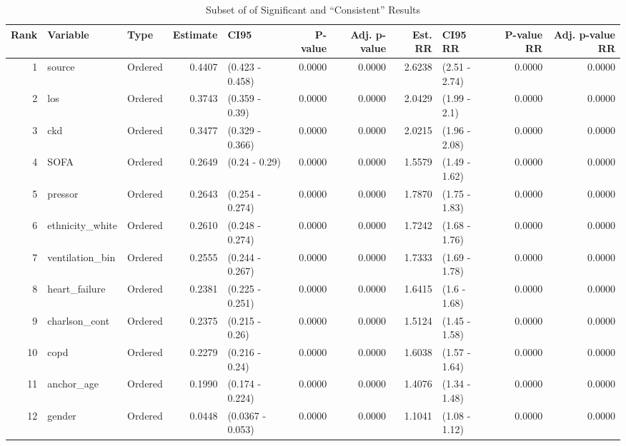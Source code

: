 \begin{table}[ht]
\centering
\caption{Subset of of Significant and ``Consistent'' Results} 
\label{consisRes}
\begin{tabular}{rllrlrrrlrr}
  \hline
Rank & Variable & Type & Estimate & CI95 & P-value & Adj. p-value & Est. RR & CI95 RR & P-value RR & Adj. p-value RR \\ 
  \hline
    1 & source & Ordered & 0.4407 & (0.423 - 0.458) & 0.0000 & 0.0000 & 2.6238 & (2.51 - 2.74) & 0.0000 & 0.0000 \\ 
      2 & los & Ordered & 0.3743 & (0.359 - 0.39) & 0.0000 & 0.0000 & 2.0429 & (1.99 - 2.1) & 0.0000 & 0.0000 \\ 
      3 & ckd & Ordered & 0.3477 & (0.329 - 0.366) & 0.0000 & 0.0000 & 2.0215 & (1.96 - 2.08) & 0.0000 & 0.0000 \\ 
      4 & SOFA & Ordered & 0.2649 & (0.24 - 0.29) & 0.0000 & 0.0000 & 1.5579 & (1.49 - 1.62) & 0.0000 & 0.0000 \\ 
      5 & pressor & Ordered & 0.2643 & (0.254 - 0.274) & 0.0000 & 0.0000 & 1.7870 & (1.75 - 1.83) & 0.0000 & 0.0000 \\ 
      6 & ethnicity\_white & Ordered & 0.2610 & (0.248 - 0.274) & 0.0000 & 0.0000 & 1.7242 & (1.68 - 1.76) & 0.0000 & 0.0000 \\ 
      7 & ventilation\_bin & Ordered & 0.2555 & (0.244 - 0.267) & 0.0000 & 0.0000 & 1.7333 & (1.69 - 1.78) & 0.0000 & 0.0000 \\ 
      8 & heart\_failure & Ordered & 0.2381 & (0.225 - 0.251) & 0.0000 & 0.0000 & 1.6415 & (1.6 - 1.68) & 0.0000 & 0.0000 \\ 
      9 & charlson\_cont & Ordered & 0.2375 & (0.215 - 0.26) & 0.0000 & 0.0000 & 1.5124 & (1.45 - 1.58) & 0.0000 & 0.0000 \\ 
     10 & copd & Ordered & 0.2279 & (0.216 - 0.24) & 0.0000 & 0.0000 & 1.6038 & (1.57 - 1.64) & 0.0000 & 0.0000 \\ 
     11 & anchor\_age & Ordered & 0.1990 & (0.174 - 0.224) & 0.0000 & 0.0000 & 1.4076 & (1.34 - 1.48) & 0.0000 & 0.0000 \\ 
     12 & gender & Ordered & 0.0448 & (0.0367 - 0.053) & 0.0000 & 0.0000 & 1.1041 & (1.08 - 1.12) & 0.0000 & 0.0000 \\ 
   \hline
\end{tabular}
\end{table}
